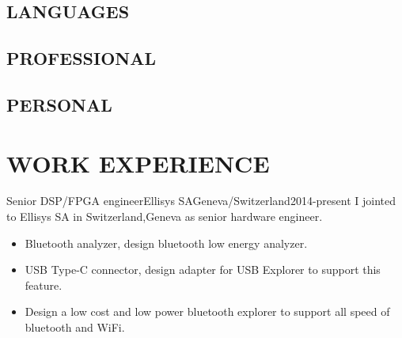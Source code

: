 \documentclass[10pt, a4paper]{article}
\begin{document}
\makeprofile

\begincols






\subsection{LANGUAGES}
\langcircles

\subsection{PROFESSIONAL}
\proskills

\subsection{PERSONAL}
\perskills

\switchcols %

\section{WORK EXPERIENCE}

\begin{cvitem}{Senior DSP/FPGA engineer}{Ellisys SA}{Geneva/Switzerland}{2014-present}
    I jointed to Ellisys SA in Switzerland,Geneva as senior hardware engineer.
    \begin{itemize}
        \item Bluetooth analyzer, design bluetooth low energy analyzer.
        \item USB Type-C connector, design adapter for USB Explorer to support this feature.
        \item Design a low cost and low power bluetooth explorer to support all speed of bluetooth and WiFi.
    \end{itemize}
\end{cvitem}
\end{document}

